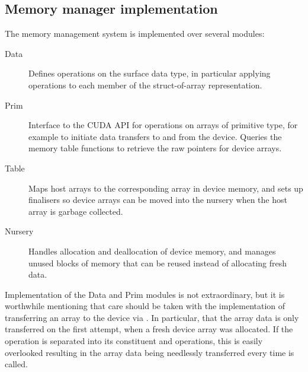 \subsection{Memory manager implementation}

The memory management system is implemented over several modules:
%
\begin{description}
\item[Data] Defines operations on the surface  data type, in
    particular applying operations to each member of the struct-of-array
    representation.

\item[Prim] Interface to the CUDA API for operations on arrays of primitive
    type, for example to initiate data transfers to and from the device. Queries
    the memory table functions to retrieve the raw pointers for device arrays.

\item[Table] Maps host arrays to the corresponding array in device memory, and
    sets up finalisers so device arrays can be moved into the nursery when the
    host array is garbage collected.

\item[Nursery] Handles allocation and deallocation of device memory, and
    manages unused blocks of memory that can be reused instead of allocating
    fresh data.
\end{description}

Implementation of the Data and Prim modules is not extraordinary, but it is
worthwhile mentioning that care should be taken with the implementation of
transferring an array to the device via . In particular, that the
array data is only transferred on the first  attempt, when a fresh
device array was allocated. If the  operation is separated into its
constituent  and  operations, this is easily overlooked
resulting in the array data being needlessly transferred every time 
is called.

